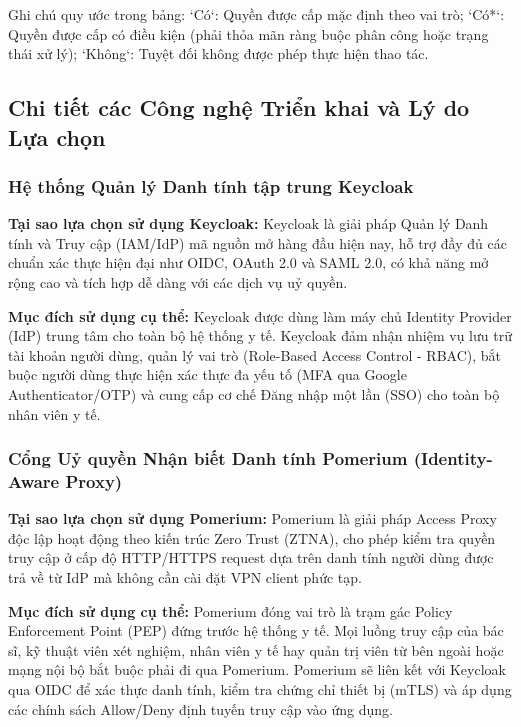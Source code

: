 \endgroup

Ghi chú quy ước trong bảng: `Có`: Quyền được cấp mặc định theo vai trò; `Có*`: Quyền được cấp có điều kiện (phải thỏa mãn ràng buộc phân công hoặc trạng thái xử lý); `Không`: Tuyệt đối không được phép thực hiện thao tác.

\subsection{Chi tiết các Công nghệ Triển khai và Lý do Lựa chọn}

\subsubsection{Hệ thống Quản lý Danh tính tập trung Keycloak}

\textbf{Tại sao lựa chọn sử dụng Keycloak:} Keycloak là giải pháp Quản lý Danh tính và Truy cập (IAM/IdP) mã nguồn mở hàng đầu hiện nay, hỗ trợ đầy đủ các chuẩn xác thực hiện đại như OIDC, OAuth 2.0 và SAML 2.0, có khả năng mở rộng cao và tích hợp dễ dàng với các dịch vụ uỷ quyền.

\textbf{Mục đích sử dụng cụ thể:} Keycloak được dùng làm máy chủ Identity Provider (IdP) trung tâm cho toàn bộ hệ thống y tế. Keycloak đảm nhận nhiệm vụ lưu trữ tài khoản người dùng, quản lý vai trò (Role-Based Access Control - RBAC), bắt buộc người dùng thực hiện xác thực đa yếu tố (MFA qua Google Authenticator/OTP) và cung cấp cơ chế Đăng nhập một lần (SSO) cho toàn bộ nhân viên y tế.

\subsubsection{Cổng Uỷ quyền Nhận biết Danh tính Pomerium (Identity-Aware Proxy)}

\textbf{Tại sao lựa chọn sử dụng Pomerium:} Pomerium là giải pháp Access Proxy độc lập hoạt động theo kiến trúc Zero Trust (ZTNA), cho phép kiểm tra quyền truy cập ở cấp độ HTTP/HTTPS request dựa trên danh tính người dùng được trả về từ IdP mà không cần cài đặt VPN client phức tạp.

\textbf{Mục đích sử dụng cụ thể:} Pomerium đóng vai trò là trạm gác Policy Enforcement Point (PEP) đứng trước hệ thống y tế. Mọi luồng truy cập của bác sĩ, kỹ thuật viên xét nghiệm, nhân viên y tế hay quản trị viên từ bên ngoài hoặc mạng nội bộ bắt buộc phải đi qua Pomerium. Pomerium sẽ liên kết với Keycloak qua OIDC để xác thực danh tính, kiểm tra chứng chỉ thiết bị (mTLS) và áp dụng các chính sách Allow/Deny định tuyến truy cập vào ứng dụng.

